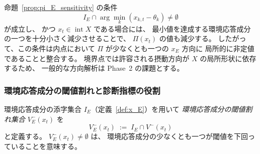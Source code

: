 \begin{remark}[$x_E$ 方向の局所感応性]
\label{rem:pi_E_local_sensitivity}
命題~\ref{prop:pi_E_sensitivity} の条件
\[
  I_E\cap\arg\min_k(x_{k,t}-\theta_k)\neq\emptyset
\]
が成立し、
かつ $x_t\in\operatorname{int}X$ である場合には、
最小値を達成する環境応答成分の一つを十分小さく減少させることで、
$\Pi(x_t)$ の値も減少する。
したがって、この条件は内点において
$\Pi$ が少なくとも一つの $x_E$ 方向に
局所的に非定値であることと整合する。
境界点では許容される摂動方向が $X$ の局所形状に依存するため、
一般的な方向解析は Phase~2 の課題とする。
\end{remark}

\subsubsection{環境応答成分の閾値割れと診断指標の役割}

\begin{definition}
\label{def:ro_related_violation}
環境応答成分の添字集合 $I_E$（定義~\ref{def:x_E}）を用いて
\emph{環境応答成分の閾値割れ集合} $V^-_E(x_t)$ を
\[
  V^-_E(x_t)\;:=\;I_E\cap V^-(x_t)
\]
と定義する。
$V^-_E(x_t)\neq\emptyset$ は、
環境応答成分の少なくとも一つが閾値を下回っていることを意味する。
\end{definition}

